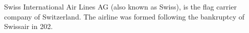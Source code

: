 Swiss International Air Lines AG (also known as Swiss), is the flag carrier company of Switzerland.
The airline was formed following the bankruptcy of Swissair in 202.
